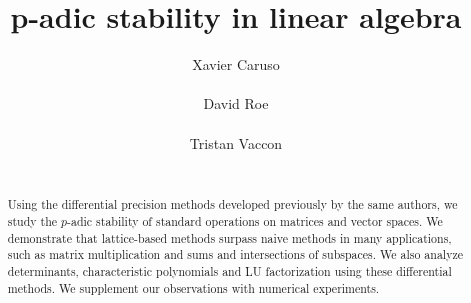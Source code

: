 \documentclass{sig-alternate}
\begin{document}
\newtheorem{theo}{Theorem}[section]
\newtheorem{lem}[theo]{Lemma}
\newtheorem{prop}[theo]{Proposition}
\newtheorem{cor}[theo]{Corollary}
\newtheorem{quest}[theo]{Question}
\newtheorem{conj}[theo]{Conjecture}
\theoremstyle{definition}
\newtheorem{rem}[theo]{Remark}
\newtheorem{ex}[theo]{Example}
\newtheorem{deftn}[theo]{Definition}

\title{p-adic stability in linear algebra}

\author{
\alignauthor Xavier Caruso\\
  \\
\alignauthor David Roe \\
  \\
\alignauthor Tristan Vaccon\\
  \\
}

\maketitle

\begin{abstract}
Using the differential precision methods developed previously by the same authors,
we study the $p$-adic stability of standard operations on matrices and vector 
spaces. We demonstrate that lattice-based methods surpass naive methods in many
applications, such as matrix multiplication and sums and intersections of subspaces.
We also analyze determinants, characteristic polynomials and LU factorization using these differential methods.
We supplement our observations with numerical experiments.
\end{abstract}


%
%
\end{document}
